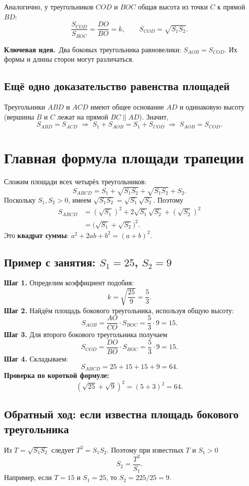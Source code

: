 \documentclass[a4paper,12pt]{article}
\newcommand{\idea}[1]{\textcolor{darkaccent}{\textbf{Ключевая идея.}}~#1}
\newcommand{\ST}{S_{ABCD}}
\begin{document}
Аналогично, у треугольников $COD$ и $BOC$ общая высота из точки $C$ к прямой $BD$:
\[
\frac{S_{COD}}{S_{BOC}}=\frac{DO}{BO}=k,
\qquad S_{COD}=\boxed{\sqrt{S_1S_2}}.
\]

\idea{Два боковых треугольника равновелики: $S_{AOB}=S_{COD}$. Их формы и длины сторон могут различаться.}

\subsection{Ещё одно доказательство равенства площадей}
Треугольники $ABD$ и $ACD$ имеют общее основание $AD$ и одинаковую высоту (вершины $B$ и $C$ лежат на прямой $BC\parallel AD$). Значит,
\[
S_{ABD}=S_{ACD}\;\Longrightarrow\;
S_1+S_{AOB}=S_1+S_{COD}\;\Longrightarrow\;S_{AOB}=S_{COD}.
\]
\clearpage

\section{Главная формула площади трапеции}
Сложим площади всех четырёх треугольников:
\[
\ST=S_1+\sqrt{S_1S_2}+\sqrt{S_1S_2}+S_2.
\]
Поскольку $S_1,S_2>0$, имеем $\sqrt{S_1S_2}=\sqrt{S_1}\sqrt{S_2}$. Поэтому
\[
\begin{aligned}
\ST&=(\sqrt{S_1})^2+2\sqrt{S_1}\sqrt{S_2}+(\sqrt{S_2})^2\\
&=\boxed{\bigl(\sqrt{S_1}+\sqrt{S_2}\bigr)^2}.
\end{aligned}
\]
Это \textbf{квадрат суммы}: $a^2+2ab+b^2=(a+b)^2$.

\subsection{Пример с занятия: $S_1=25$, $S_2=9$}
\textbf{Шаг 1.} Определим коэффициент подобия:
\[
k=\sqrt{\frac{25}{9}}=\frac{5}{3}.
\]
\textbf{Шаг 2.} Найдём площадь бокового треугольника, используя общую высоту:
\[
S_{AOB}=\frac{AO}{CO}\cdot S_{BOC}=\frac53\cdot 9=15.
\]
\textbf{Шаг 3.} Для второго бокового треугольника получаем
\[
S_{COD}=\frac{DO}{BO}\cdot S_{BOC}=\frac53\cdot 9=15.
\]
\textbf{Шаг 4.} Складываем:
\[
\boxed{\ST=25+15+15+9=64.}
\]
\textbf{Проверка по короткой формуле:}
\[
(\sqrt{25}+\sqrt9)^2=(5+3)^2=64.
\]

\subsection{Обратный ход: если известна площадь бокового треугольника}
Из $T=\sqrt{S_1S_2}$ следует $T^2=S_1S_2$. Поэтому при известных $T$ и $S_1>0$
\[
\boxed{S_2=\frac{T^2}{S_1}}.
\]
Например, если $T=15$ и $S_1=25$, то $S_2=225/25=9$.
\clearpage
\end{document}
